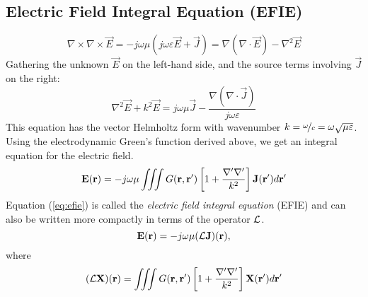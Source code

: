 \subsection{Electric Field Integral Equation (EFIE)}
\begin{equation*}
	\nabla \times \nabla \times \vec{E}  = -j\omega\mu (j\omega\varepsilon \vec{E} + \vec{J}) = \nabla (\nabla \cdot \vec{E}) - \nabla^2 \vec{E}
\end{equation*}
Gathering the unknown $\vec{E}$ on the left-hand side, and the source terms involving $\vec{J}$ on the right:
\begin{equation}
	\nabla^2 \vec{E} + k^2 \vec{E} = j\omega\mu\vec{J} - \frac{\nabla (\nabla \cdot \vec{J})}{j\omega\varepsilon}
\end{equation}
This equation has the vector Helmholtz form with wavenumber $k = \nicefrac{\omega}{c} = \omega \sqrt{\mu \varepsilon}$. Using the electrodynamic Green's function derived above, we get an integral equation for the electric field.
\begin{equation}
	\mathbf{E}(\mathbf{r}) = -j\omega\mu \iiint G(\mathbf{r}, \mathbf{r}^\prime) \left[ 1 + \frac
	{\nabla^\prime \nabla^\prime}{k^2} \right] \mathbf{J}(\mathbf{r}^\prime) d\mathbf{r}^\prime
	\label{eq:efie}
\end{equation}
Equation (\ref{eq:efie}) is called the \emph{electric field integral equation} (EFIE) and can also be written more compactly in terms of the operator $\mathcal{L}$.
\begin{equation}
	\mathbf{E}(\mathbf{r}) = -j\omega\mu (\mathcal{L} \mathbf{J})(\mathbf{r}),
\end{equation}
where
\begin{equation}
	(\mathcal{L}\mathbf{X})(\mathbf{r}) = \iiint G(\mathbf{r}, \mathbf{r}^\prime) \left[ 1 + \frac{\nabla^\prime \nabla^\prime}{k^2} \right] \mathbf{X}(\mathbf{r}^\prime) d\mathbf{r}^\prime
\end{equation}